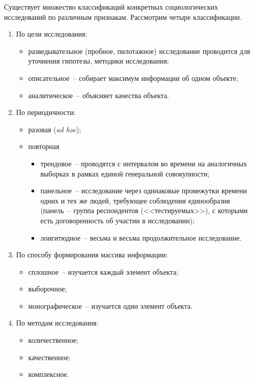   Существует множество классификаций конкретных социологических исследований по
  различным признакам. Рассмотрим четыре классификации.
  \begin{enumerate}
    \item По цели исследования:
      \begin{itemize}
        \item разведывательное (пробное, пилотажное) исследование проводится для
          уточнения гипотезы, методики исследования;
        \item описательное~-- собирает максимум информации об одном объекте;
        \item аналитическое~-- объясняет качества объекта.
      \end{itemize}
    \item По периодичности:
      \begin{itemize}
        \item разовая (\emph{ad hoc});
        \item повторная
          \begin{itemize}
            \item трендовое~-- проводятся с интервалом во времени на аналогичных
              выборках в рамках единой генеральной совокупности;
            \item панельное~-- исследование через одинаковые промежутки времени
              одних и тех же людей, требующее соблюдения единообразия (панель~--
              группа респондентов (<<тестируемых>>), с которыми есть
              договоренность об участии в исследовании);
            \item лонгитюдное~-- весьма и весьма продолжительное исследование.
          \end{itemize}
      \end{itemize}
    \item По способу формирования массива информации:
      \begin{itemize}
        \item сплошное~-- изучается каждый элемент объекта;
        \item выборочное;
        \item монографическое~-- изучается один элемент объекта.
      \end{itemize}
    \item По методам исследования:
      \begin{itemize}
        \item количественное;
        \item качественное;
        \item комплексное.
      \end{itemize}
  \end{enumerate}

